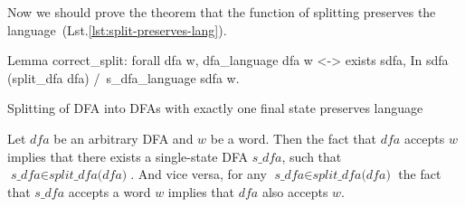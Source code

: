 







Now we should prove the theorem that the function of splitting preserves the language~(Lst.\ref{lst:split-preserves-lang}).

\begin{listing}[h]
    \begin{pyglist}[language=coq, numbers=none, numbersep=5pt]
  Lemma correct_split:
    forall dfa w,
      dfa_language dfa w <->
      exists sdfa, 
         In sdfa (split_dfa dfa) /\ 
         s_dfa_language sdfa w.
    \end{pyglist}
    \caption{Splitting of DFA into DFAs with exactly one final state preserves language}
    \label{lst:split-preserves-lang}
\end{listing}

\begin{theorem}
  Let $\textit{dfa}$ be an arbitrary DFA and $w$ be a word. Then the fact that $\textit{dfa}$ accepts $w$ implies that there exists a single-state DFA $\textit{s\_dfa}$, such that $\textit{s\_dfa} \in \textit{split\_dfa(dfa)}$. And vice versa, for any $\textit{s\_dfa} \in \textit{split\_dfa(dfa)}$ the fact that $\textit{s\_dfa}$ accepts a word $w$ implies that $\textit{dfa}$ also accepts $w$.
\end{theorem}

